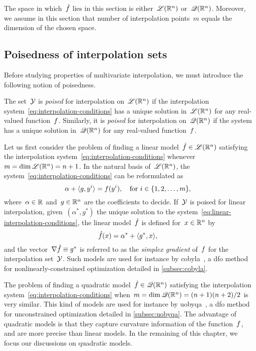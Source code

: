 The space in which~$\objm$ lies in this section is either~$\mathscr{L}(\mathbb{R}^n)$ or~$\mathscr{Q}(\mathbb{R}^n)$.
Moreover, we assume in this section that number of interpolation points~$m$ equals the dimension of the chosen space.

\subsection{Poisedness of interpolation sets}

Before studying properties of multivariate interpolation, we must introduce the following notion of poisedness.

\begin{definition}[Poisedness]
    The set~$\xpt$ is \emph{poised} for interpolation on~$\mathscr{L}(\mathbb{R}^n)$ if the interpolation system~\cref{eq:interpolation-conditions} has a unique solution in~$\mathscr{L}(\mathbb{R}^n)$ for any real-valued function~$f$.
    Similarly, it is \emph{poised} for interpolation on~$\mathscr{Q}(\mathbb{R}^n)$ if the system has a unique solution in~$\mathscr{Q}(\mathbb{R}^n)$ for any real-valued function~$f$.
\end{definition}

Let us first consider the problem of finding a linear model~$\objm \in \lpoly$ satisfying the interpolation system~\cref{eq:interpolation-conditions} whenever~$m = \dim \mathscr{L}(\mathbb{R}^n) = n + 1$.
In the natural basis of~$\mathscr{L}(\mathbb{R}^n)$, the system~\cref{eq:interpolation-conditions} can be reformulated as
\begin{equation}
    \label{eq:linear-interpolation-conditions}
    \alpha + \langle g, y^i\rangle = f(y^i), \quad \text{for~$i \in \{1, 2, \dots, m\}$},
\end{equation}
where~$\alpha \in \mathbb{R}$ and~$g \in \mathbb{R}^n$ are the coefficients to decide.
If~$\xpt$ is poised for linear interpolation, given~$(\alpha^{\ast}, g^{\ast})$ the unique solution to the system~\cref{eq:linear-interpolation-conditions}, the linear model~$\objm$ is defined for~$x \in \mathbb{R}^n$ by
\begin{equation*}
    \objm(x) = \alpha^{\ast} + \inner{g^{\ast}, x},
\end{equation*}
and the vector~$\nabla \objm \equiv g^{\ast}$ is referred to as the \emph{simplex gradient} of~$f$ for the interpolation set~$\xpt$.
Such models are used for instance by \gls{cobyla}~\cite{Powell_1994}, a \gls{dfo} method for nonlinearly-constrained optimization detailed in \cref{subsec:cobyla}.

The problem of finding a quadratic model~$\objm \in \qpoly$ satisfying the interpolation system~\cref{eq:interpolation-conditions} when~$m = \dim \mathscr{Q}(\mathbb{R}^n) = (n + 1)(n + 2) / 2$ is very similar.
This kind of models are used for instance by \gls{uobyqa}~\cite{Powell_2002}, a \gls{dfo} method for unconstrained optimization detailed in \cref{subsec:uobyqa}.
The advantage of quadratic models is that they capture curvature information of the function~$f$, and are more precise than linear models.
In the remaining of this chapter, we focus our discussions on quadratic models.

